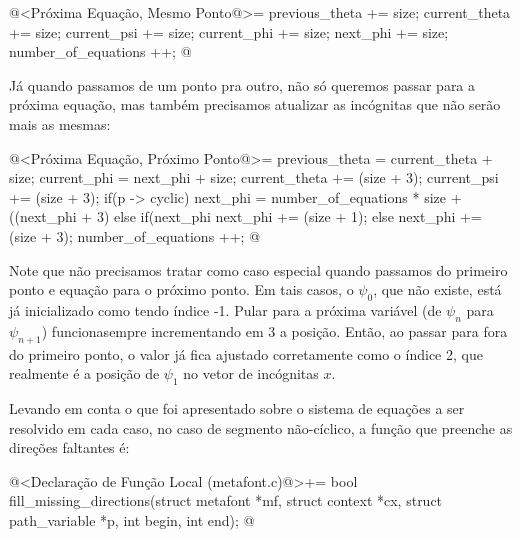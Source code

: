 \iniciocodigo
@<Próxima Equação, Mesmo Ponto@>=
{
  previous_theta += size;
  current_theta += size;
  current_psi += size;
  current_phi += size;
  next_phi += size;
  number_of_equations ++;
}
@
\fimcodigo

Já quando passamos de um ponto pra outro, não só queremos passar para
a próxima equação, mas também precisamos atualizar as incógnitas que
não serão mais as mesmas:

\iniciocodigo
@<Próxima Equação, Próximo Ponto@>=
{
  previous_theta = current_theta + size;
  current_phi = next_phi + size;
  current_theta += (size + 3);
  current_psi += (size + 3);
  if(p -> cyclic)
    next_phi = number_of_equations * size + ((next_phi + 3) %
  else{
    if(next_phi %
      next_phi += (size + 1);
    else
      next_phi += (size + 3);
  }
  number_of_equations ++;
}
@
\fimcodigo

Note que não precisamos tratar como caso especial quando passamos do
primeiro ponto e equação para o próximo ponto. Em tais casos, o
$\psi_0$, que não existe, está já inicializado como tendo índice
-1. Pular para a próxima variável (de $\psi_{n}$ para $\psi_{n+1}$)
funcionasempre incrementando em 3 a posição. Então, ao passar para
fora do primeiro ponto, o valor já fica ajustado corretamente como o
índice 2, que realmente é a posição de $\psi_1$ no vetor de incógnitas
$x$.

Levando em conta o que foi apresentado sobre o sistema de equações a
ser resolvido em cada caso, no caso de segmento não-cíclico, a função
que preenche as direções faltantes é:

\iniciocodigo
@<Declaração de Função Local (metafont.c)@>+=
bool fill_missing_directions(struct metafont *mf, struct context *cx,
                             struct path_variable *p, int begin, int end);
@
\fimcodigo

